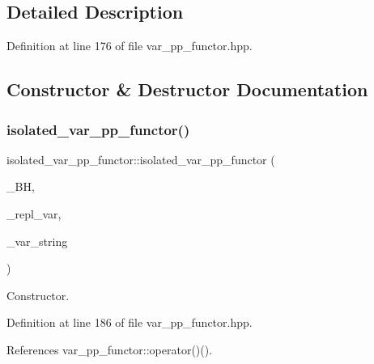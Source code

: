 \subsection{Detailed Description}


Definition at line 176 of file var\+\_\+pp\+\_\+functor.\+hpp.



\subsection{Constructor \& Destructor Documentation}
\mbox{\label{structisolated__var__pp__functor_afd257edce29dd2262d00f33a1e13e27c}} 
\subsubsection{\texorpdfstring{isolated\+\_\+var\+\_\+pp\+\_\+functor()}{isolated\_var\_pp\_functor()}}
{\footnotesize\ttfamily isolated\+\_\+var\+\_\+pp\+\_\+functor\+::isolated\+\_\+var\+\_\+pp\+\_\+functor (\begin{DoxyParamCaption}\item[{const \hyperlink{behavioral__helper_8hpp_aae973b54cac87eef3b27442aa3e1e425}{Behavioral\+Helper\+Const\+Ref}}]{\+\_\+\+BH,  }\item[{unsigned int}]{\+\_\+repl\+\_\+var,  }\item[{std\+::string}]{\+\_\+var\+\_\+string }\end{DoxyParamCaption})\hspace{0.3cm}{\ttfamily [inline]}}



Constructor. 



Definition at line 186 of file var\+\_\+pp\+\_\+functor.\+hpp.



References var\+\_\+pp\+\_\+functor\+::operator()().

